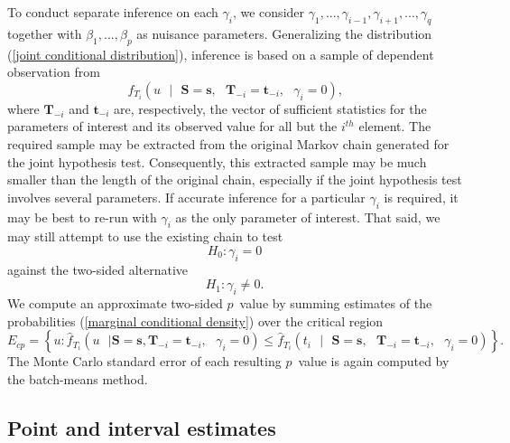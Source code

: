 \documentclass[article, shortnames]{jss}
\begin{document}
To conduct separate inference on each $\gamma _{i}$, we consider $%
\gamma_{1},...,\gamma_{i-1},\gamma_{i+1},...,\gamma_{q}$ together with $%
\beta _{1},...,\beta _{p}$ as nuisance parameters. Generalizing
the distribution (\ref{joint conditional distribution}), inference is based on a
sample of dependent observation from%
\begin{equation}
f_{T_{i}}\left( u \text{ }|\text{ }%
\mathbf{S=s,}\text{ }\mathbf{T}_{-i}=%
\mathbf{t}_{-i},\text{ }\gamma _{i}=0\right) \text{,}
\label{marginal conditional density}
\end{equation}%
where $\mathbf{T}_{-i}$ and
$\mathbf{t}_{-i}$ are, respectively, the
vector of sufficient statistics for the parameters of interest
and its observed value for all but the $i^{th}$ element.
The required sample may be extracted from the original
Markov chain generated for the joint hypothesis test.
Consequently, this extracted sample may be much smaller than the length
of the original chain, especially
if the joint hypothesis test involves several parameters.
If accurate inference for a particular $\gamma_i$ is required,
it may be best to re-run  with $\gamma_i$
as the only parameter of interest.
That said, we may still attempt to use the existing chain to test
\begin{equation*}
H_{0}:\gamma _{i}=0
\end{equation*}%
against the two-sided alternative%
\begin{equation*}
H_{1}:\gamma _{i}\neq 0.
\end{equation*}
We compute an approximate two-sided $p$~value by summing estimates of
the probabilities (\ref{marginal conditional density}) over the critical region%
\begin{equation*}
E_{cp}=\left\{ u:\hat{f}_{T_{i}}\left( u\text{ }|\text{
}\mathbf{S=s},\text{
}\mathbf{T}_{-i}=\mathbf{t}_{-i},\text{ }\gamma _{i}=0\right) \leq \hat{f}%
_{T_{i}}\left( t_{i}\text{ }|\text{ }\mathbf{S=s,}\text{ }\mathbf{T}_{-i}=%
\mathbf{t}_{-i},\text{ }\gamma _{i}=0\right) \right\} .
\end{equation*}%
The Monte Carlo standard error of each resulting $p$~value is again
computed by the batch-means method.

\subsection{Point and interval estimates}
\end{document}
